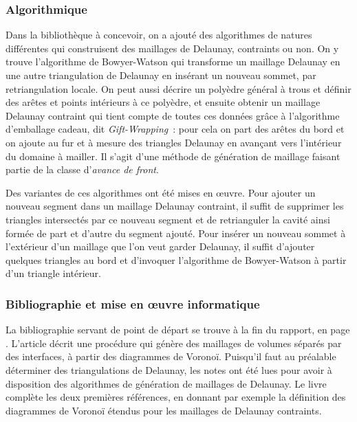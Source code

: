 \documentclass[12pt,a4paper]{report}
\begin{document}
\subsubsection{Algorithmique}
Dans la bibliothèque à concevoir, on a ajouté des algorithmes de natures différentes qui construisent des maillages de Delaunay, contraints ou non. On y trouve l'algorithme de Bowyer-Watson qui transforme un maillage Delaunay en une autre triangulation de Delaunay en insérant un nouveau sommet, par retriangulation locale. On peut aussi décrire un polyèdre général à trous et définir des arêtes et points intérieurs à ce polyèdre, et ensuite obtenir un maillage Delaunay contraint qui tient compte de toutes ces données grâce à l'algorithme d'emballage cadeau, dit \emph{Gift-Wrapping}~: pour cela on part des arêtes du bord et on ajoute au fur et à mesure des triangles Delaunay en avançant vers l'intérieur du domaine à mailler. Il s'agit d'une méthode de génération de maillage faisant partie de la classe d'\emph{avance de front}.

Des variantes de ces algorithmes ont été mises en \oe{}uvre. Pour ajouter un nouveau segment dans un maillage Delaunay contraint, il suffit de supprimer les triangles intersectés par ce nouveau segment et de retrianguler la cavité ainsi formée de part et d'autre du segment ajouté.
Pour insérer un nouveau sommet à l'extérieur d'un maillage que l'on veut garder Delaunay, il suffit d'ajouter quelques triangles au bord et d'invoquer l'algorithme de Bowyer-Watson à partir d'un triangle intérieur.

\subsubsection{Bibliographie et mise en \oe{}uvre informatique}

La bibliographie servant de point de départ se trouve à la fin du rapport, en page \pageref{biblio}. L'article \cite{Garimella} décrit une procédure qui génère des maillages de volumes séparés par des interfaces, à partir des diagrammes de Voronoï. Puisqu'il faut au préalable déterminer des triangulations de Delaunay, les notes \cite{delnotes} ont été lues pour avoir à disposition des algorithmes de génération de maillages de Delaunay. Le livre \cite{Edelsbrunner} complète les deux premières références, en donnant par exemple la définition des diagrammes de Voronoï étendus pour les maillages de Delaunay contraints.
\end{document}
